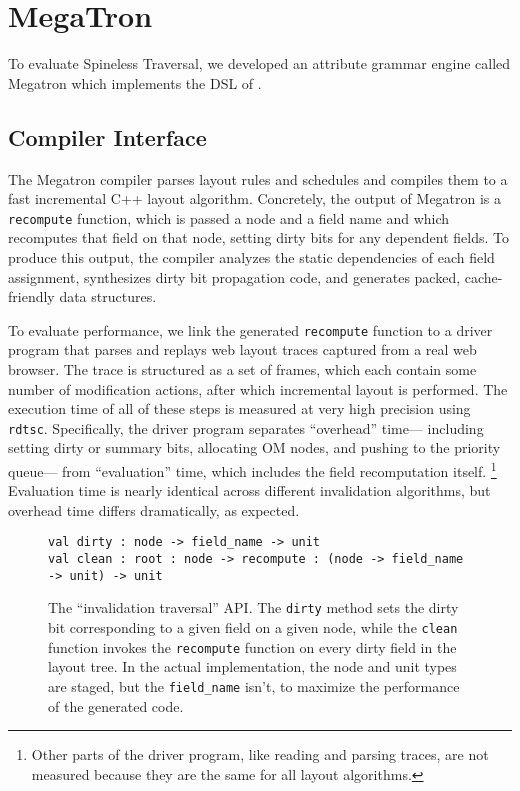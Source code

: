 \section{MegaTron}

To evaluate Spineless Traversal,
  we developed an attribute grammar engine called Megatron
  which implements the DSL of .

\subsection{Compiler Interface}
\label{sec:compiler}

The Megatron compiler
  parses layout rules and schedules
  and compiles them to a fast incremental C++ layout algorithm.
Concretely, the output of Megatron
  is a \texttt{recompute} function,
  which is passed a node and a field name
  and which recomputes that field on that node,
  setting dirty bits for any dependent fields.
To produce this output, the compiler
  analyzes the static dependencies of each field assignment,
  synthesizes dirty bit propagation code,
  and generates packed, cache-friendly data structures.

To evaluate performance,
  we link the generated \texttt{recompute} function
  to a driver program that parses and replays web layout traces
  captured from a real web browser.
The trace is structured as a set of frames,
  which each contain some number of modification actions,
  after which incremental layout is performed.
The execution time of all of these steps is measured
  at very high precision using \texttt{rdtsc}.
Specifically, the driver program
  separates ``overhead'' time---%
  including setting dirty or summary bits,
  allocating OM nodes, and pushing to the priority queue---%
  from ``evaluation'' time,
  which includes the field recomputation itself.%
\footnote{
  Other parts of the driver program,
    like reading and parsing traces, are not measured
    because they are the same for all layout algorithms.}
Evaluation time is nearly identical
  across different invalidation algorithms,
  but overhead time differs dramatically, as expected.

\begin{figure}[tbp]
\begin{verbatim}
val dirty : node -> field_name -> unit
val clean : root : node -> recompute : (node -> field_name -> unit) -> unit
\end{verbatim}
\caption{
  The ``invalidation traversal'' API.
  The \texttt{dirty} method sets the dirty bit
    corresponding to a given field on a given node,
    while the \texttt{clean} function
    invokes the \texttt{recompute} function
    on every dirty field in the layout tree.
  In the actual implementation,
    the node and unit types are staged,
    but the \texttt{field_name} isn't,
    to maximize the performance of the generated code.}
\label{fig:traversal-api}
\end{figure}


